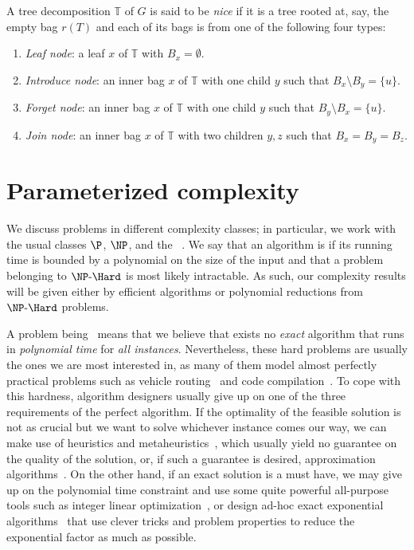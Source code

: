 \begin{class_definition*}
    A tree decomposition $\mathbb{T}$ of $G$ is said to be \emph{nice} if it is a tree rooted at, say, the empty bag $r(T)$ and each of its bags is from one of the following four types:
    \begin{enumerate}
        \item \emph{Leaf node}: a leaf $x$ of $\mathbb{T}$ with $B_x = \emptyset$.
        \item \emph{Introduce node}: an inner bag $x$ of $\mathbb{T}$ with one child $y$ such that $B_x \setminus B_y = \{u\}$.
        \item \emph{Forget node}: an inner bag $x$ of $\mathbb{T}$ with one child $y$ such that $B_y \setminus B_x = \{u\}$.
        \item \emph{Join node}: an inner bag $x$ of $\mathbb{T}$ with two children $y,z$ such that $B_x = B_y = B_z$.
    \end{enumerate}
\end{class_definition*}

\section{Parameterized complexity}

We discuss problems in different complexity classes; in particular, we work with the usual classes $\P$, $\NP$, and the ~\citep{polynomial_hierarchy}.
We say that an algorithm is  if its running time is bounded by a polynomial on the size of the input and that a problem belonging to $\NPH$ is most likely intractable.
As such, our complexity results will be given either by efficient algorithms or polynomial reductions from $\NPH$ problems.

A problem being \NPH\ means that we believe that exists no \textit{exact} algorithm that runs in \textit{polynomial time} for \textit{all instances}.
Nevertheless, these hard problems are usually the ones we are most interested in, as many of them model almost perfectly practical problems such as vehicle routing~\citep{vrp} and code compilation~\citep{compilers}.
To cope with this hardness, algorithm designers usually give up on one of the three requirements of the perfect algorithm.
If the optimality of the feasible solution is not as crucial but we want to solve whichever instance comes our way, we can make use of heuristics and metaheuristics~\citep{heuristics}, which usually yield no guarantee on the quality of the solution, or, if such a guarantee is desired, approximation algorithms~\citep{approximation}.
On the other hand, if an exact solution is a must have, we may give up on the polynomial time constraint and use some quite powerful all-purpose tools such as integer linear optimization~\citep{linear_optimization}, or design ad-hoc exact exponential algorithms~\citep{exact_exponential_algorithms} that use clever tricks and problem properties to reduce the exponential factor as much as possible.

